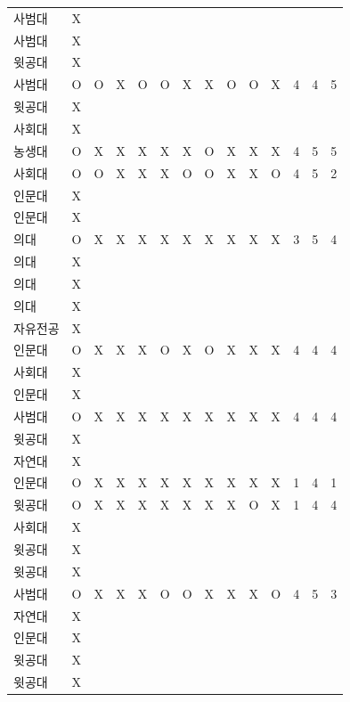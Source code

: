 \documentclass[11pt,a4paper]{article}
\begin{document}
\begin{center}
\begin{supertabular}{ | p{2cm} | x{1.6cm} | x{0.5cm} | x{0.5cm} | x{0.5cm} | x{0.5cm} | x{0.5cm} | x{0.5cm} | x{0.5cm} | x{0.5cm} | x{0.5cm} | x{0.5cm} | x{0.5cm} | x{0.5cm} | }
사범대 & X & & & & & & & & & & & & \\
사범대 & X & & & & & & & & & & & & \\
윗공대 & X & & & & & & & & & & & & \\
사범대 & O & O & X & O & O & X & X & O & O & X & 4 & 4 & 5 \\
윗공대 & X & & & & & & & & & & & & \\
사회대 & X & & & & & & & & & & & & \\
농생대 & O & X & X & X & X & X & O & X & X & X & 4 & 5 & 5 \\
사회대 & O & O & X & X & X & O & O & X & X & O & 4 & 5 & 2 \\
인문대 & X & & & & & & & & & & & & \\
인문대 & X & & & & & & & & & & & & \\
의대 & O & X & X & X & X & X & X & X & X & X & 3 & 5 & 4 \\
의대 & X & & & & & & & & & & & & \\
의대 & X & & & & & & & & & & & & \\
의대 & X & & & & & & & & & & & & \\
자유전공 & X & & & & & & & & & & & & \\
인문대 & O & X & X & X & O & X & O & X & X & X & 4 & 4 & 4 \\
사회대 & X & & & & & & & & & & & & \\
인문대 & X & & & & & & & & & & & & \\
사범대 & O & X & X & X & X & X & X & X & X & X & 4 & 4 & 4 \\
윗공대 & X & & & & & & & & & & & & \\
자연대 & X & & & & & & & & & & & & \\
인문대 & O & X & X & X & X & X & X & X & X & X & 1 & 4 & 1 \\
윗공대 & O & X & X & X & X & X & X & X & O & X & 1 & 4 & 4 \\
사회대 & X & & & & & & & & & & & & \\
윗공대 & X & & & & & & & & & & & & \\
윗공대 & X & & & & & & & & & & & & \\
사범대 & O & X & X & X & O & O & X & X & X & O & 4 & 5 & 3 \\
자연대 & X & & & & & & & & & & & & \\
인문대 & X & & & & & & & & & & & & \\
윗공대 & X & & & & & & & & & & & & \\
윗공대 & X & & & & & & & & & & & & \\

\end{supertabular}
\end{center}
\end{document}
